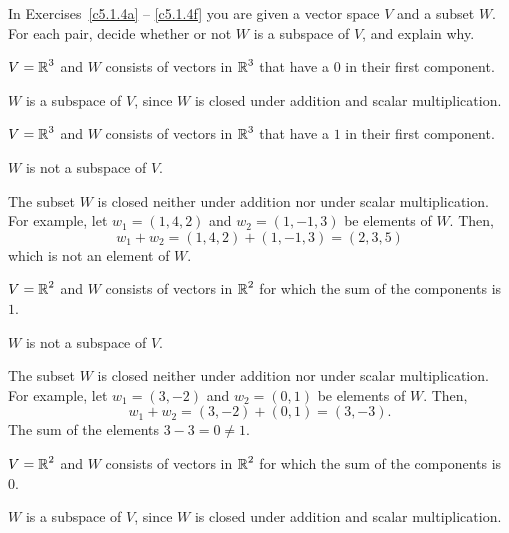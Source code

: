 \documentclass{ximera}
\begin{document}
\noindent In Exercises~\ref{c5.1.4a} -- \ref{c5.1.4f} you are given a
vector space $V$ and a subset $W$.  For each pair, decide whether or
not $W$ is a subspace of $V$, and explain why.
\begin{exercise} \label{c5.1.4a}
$V=\mbox{$\Bbb{R}$}^3$ and $W$ consists of vectors in $\mbox{$\Bbb{R}$}^3$
     that have a $0$ in their first component.

\begin{solution}
$W$ is a subspace of $V$, since $W$ is closed under
addition and scalar multiplication.

\end{solution}
\end{exercise}
\begin{exercise} \label{c5.1.4b}
$V=\mbox{$\Bbb{R}$}^3$ and $W$ consists of vectors in $\mbox{$\Bbb{R}$}^3$
     that have a $1$ in their first component.

\begin{solution}
\ans $W$ is not a subspace of $V$.

\soln The subset $W$ is closed neither under addition nor under scalar
multiplication.  For example, let $w_1 = (1,4,2)$ and $w_2 = (1,-1,3)$
be elements of $W$.  Then,
\[
w_1 + w_2 = (1,4,2) + (1,-1,3) = (2,3,5)
\]
which is not an element of $W$.


\end{solution}
\end{exercise}
\begin{exercise} \label{c5.1.4d}
$V=\mbox{$\Bbb{R}$}^2$ and $W$ consists of vectors in $\mbox{$\Bbb{R}$}^2$
     for which the sum of the components is $1$.

\begin{solution}
\ans $W$ is not a subspace of $V$.

\soln The subset $W$ is closed neither under addition nor under scalar
multiplication.  For example, let $w_1 = (3,-2)$ and $w_2 = (0,1)$ be
elements of $W$.  Then,
\[
w_1 + w_2 = (3,-2) + (0,1) = (3,-3).
\]
The sum of the elements $3 - 3 = 0 \neq 1$.

\end{solution}
\end{exercise}
\begin{exercise} \label{c5.1.4c}
$V=\mbox{$\Bbb{R}$}^2$ and $W$ consists of vectors in $\mbox{$\Bbb{R}$}^2$
     for which the sum of the components is $0$.

\begin{solution}
$W$ is a subspace of $V$, since $W$ is closed under
addition and scalar multiplication.

\end{solution}
\end{exercise}
\end{document}
